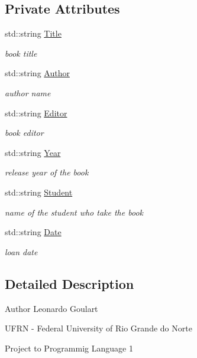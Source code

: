 \subsection*{Private Attributes}
\begin{DoxyCompactItemize}
\item 
std\+::string \hyperlink{classBook_a862b94a2fd16ac90209afa4393d8df8a}{Title}
\begin{DoxyCompactList}\small\item\em book title \end{DoxyCompactList}\item 
std\+::string \hyperlink{classBook_a12872f571d8e7c5bfa31f4142e7848eb}{Author}
\begin{DoxyCompactList}\small\item\em author name \end{DoxyCompactList}\item 
std\+::string \hyperlink{classBook_a18602b69a54cf1533569ac857681b03f}{Editor}
\begin{DoxyCompactList}\small\item\em book editor \end{DoxyCompactList}\item 
std\+::string \hyperlink{classBook_ad3fc2c944e788d179c4d836f36662ae2}{Year}
\begin{DoxyCompactList}\small\item\em release year of the book \end{DoxyCompactList}\item 
std\+::string \hyperlink{classBook_ae89daf9343a917dced86da884961ed3a}{Student}
\begin{DoxyCompactList}\small\item\em name of the student who take the book \end{DoxyCompactList}\item 
std\+::string \hyperlink{classBook_a45a1a5f93a5ec021cc605b0c905d1d6f}{Date}
\begin{DoxyCompactList}\small\item\em loan date \end{DoxyCompactList}\end{DoxyCompactItemize}


\subsection{Detailed Description}
\begin{DoxyAuthor}{Author}
Leonardo Goulart 

U\+F\+RN -\/ Federal University of Rio Grande do Norte 

Project to Programmig Language 1 
\end{DoxyAuthor}


